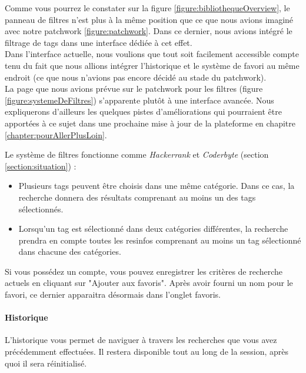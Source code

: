 Comme vous pourrez le constater sur la figure \ref{figure:bibliothequeOverview}, le panneau de filtres n'est plus à la même position que ce que nous avions imaginé avec notre patchwork \ref{figure:patchwork}. Dans ce dernier, nous avions intégré le filtrage de \glspl{tag} dans une interface dédiée à cet effet.\\

Dans l'interface actuelle, nous voulions que tout soit facilement accessible compte tenu du fait que nous allions intégrer l'historique et le système de favori au même endroit (ce que nous n'avions pas encore décidé au stade du patchwork).\\

La page que nous avions prévue sur le patchwork pour les filtres (figure \ref{figure:systemeDeFiltres}) s'apparente plutôt à une interface avancée. Nous expliquerons d'ailleurs les quelques pistes d'améliorations qui pourraient être apportées à ce sujet dans une prochaine mise à jour de la plateforme en chapitre \ref{chapter:pourAllerPlusLoin}.

Le système de filtres fonctionne comme \textit{Hackerrank} et \textit{Coderbyte} (section \ref{section:situation}) :

\begin{itemize}
    \item Plusieurs \glspl{tag} peuvent être choisis dans une même catégorie. Dans ce cas, la recherche donnera des résultats comprenant au moins un des \glspl{tag} sélectionnés.
    \item Lorsqu'un \gls{tag} est sélectionné dans deux catégories différentes, la recherche prendra en compte toutes les \glspl{resinfo} comprenant au moins un \gls{tag} sélectionné dans chacune des catégories.
\end{itemize}

Si vous possédez un compte, vous pouvez enregistrer les critères de recherche actuels en cliquant sur "Ajouter aux favoris". Après avoir fourni un nom pour le favori, ce dernier apparaitra désormais dans l'onglet favoris.\\

\paragraph{Historique} L'historique vous permet de naviguer à travers les recherches que vous avez précédemment effectuées. Il restera disponible tout au long de la session, après quoi il sera réinitialisé.\\

